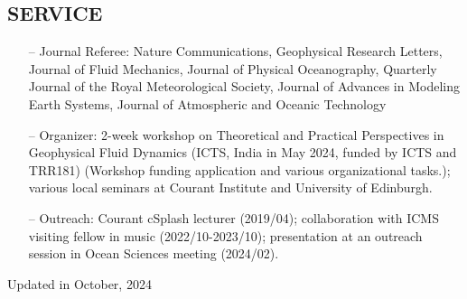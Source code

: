 \documentclass[margin]{res}
\begin{document}
\begin{resume}
 
\section{{\normalfont SERVICE}}
\begin{itemize}[leftmargin=*,noitemsep]
\item[--]{Journal Referee: Nature Communications, Geophysical Research Letters, Journal of Fluid Mechanics, Journal of Physical Oceanography, Quarterly Journal of the Royal Meteorological Society, Journal of Advances in Modeling Earth Systems, Journal of Atmospheric and Oceanic Technology}
\item[--]{Organizer: 2-week workshop on Theoretical and Practical Perspectives in Geophysical Fluid Dynamics (ICTS, India in May 2024, funded by ICTS and TRR181) (Workshop funding application and various organizational tasks.);  various local seminars at Courant Institute and University of Edinburgh.}
\item[--]{Outreach: Courant cSplash lecturer (2019/04); collaboration with ICMS visiting fellow in music (2022/10-2023/10); presentation at an outreach session in Ocean Sciences meeting (2024/02).}
\end{itemize}
\end{resume}



\begin{flushright}
Updated in October, 2024
\end{flushright}

\end{document}
